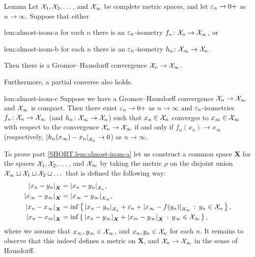 \begin{thm}{Lemma}\label{lem:almost-isom}
Let $\mathcal{X}_1,\mathcal{X}_2,\dots$, and $\mathcal{X}_\infty$ be complete metric spaces,
and let $\varepsilon_n\to0+$ as $n\to\infty$.
Suppose that either 
\begin{subthm}{lem:almost-isom-a}
for each $n$ there is an $\varepsilon_n$-isometry $f_n\colon\mathcal{X}_n\to\mathcal{X}_\infty$, or
\end{subthm}
\begin{subthm}{lem:almost-isom-b}
for each $n$ there is an $\varepsilon_n$-isometry $h_n\colon\mathcal{X}_\infty\to\mathcal{X}_n$.
\end{subthm}
Then there is a Gromov--Hausdorff convergence $\mathcal{X}_n\to \mathcal{X}_\infty$.

Furthermore, a partial converse also holds.

\begin{subthm}{lem:almost-isom-c}
Suppose we have a Gromov--Hausdorff convergence $\mathcal{X}_n\to \mathcal{X}_\infty$ and $\mathcal{X}_\infty$ is compact.
Then there exist $\varepsilon_n\to0+$ as $n\to\infty$ and $\varepsilon_n$-isometries $f_n\colon\mathcal{X}_n\to\mathcal{X}_\infty$ (and $h_n\colon\mathcal{X}_\infty\to\mathcal{X}_n$)
such that $x_n\in \mathcal{X}_n$ converges to $x_\infty \in  \mathcal{X}_\infty$ with respect to the  convergence $\mathcal{X}_n\to \mathcal{X}_\infty$ if and only if $f_n(x_n)\to x_\infty$ (respectively, $|{h_n(x_\infty) }-{x_n}|_{\mathcal{X}_n}^{{}}\to 0$) as $n\to\infty$.
\end{subthm}
\end{thm}


To prove part \ref{SHORT.lem:almost-isom-a} let us construct a common space $\bm{X}$ for the spaces $\mathcal{X}_1,\mathcal{X}_2,\dots$, and $\mathcal{X}_\infty$
by taking the metric $\rho$ on the disjoint union $\mathcal{X}_\infty\sqcup\mathcal{X}_1\sqcup\mathcal{X}_2\sqcup\dots$ that is defined the following way:
\begin{align*}
|{x_n}-{y_n}|_{\bm{X}}^{{}}&=|{x_n}-{y_n}|_{\mathcal{X}_n}^{{}},
\\
|{x_\infty}-{y_\infty}|_{\bm{X}}^{{}}&=|{x_\infty}-{y_\infty}|_{\mathcal{X}_\infty}^{{}},
\\
|{x_n}-{x_\infty}|_{\bm{X}}^{{}}&=\inf\left\{\,{|{x_n}-{y_n}|_{\mathcal{X}_n}^{{}}+\varepsilon_n+|{x_\infty}-{f(y_n)}|_{\mathcal{X}_\infty}^{{}}}\,:\,{{y_n}\in \mathcal{X}_n}\,\right\},
\\
|{x_n}-{x_m}|_{\bm{X}}^{{}}&=\inf\left\{\,{|{x_n}-{y_\infty}|_{\bm{X}}^{{}}+|{x_m}-{y_\infty}|_{\bm{X}}^{{}}}\,:\,{y_\infty\in\mathcal{X}_\infty}\,\right\},
\end{align*}
where we assume that $x_\infty,y_\infty\in \mathcal{X}_\infty$, and $x_n,y_n\in \mathcal{X}_n$ for each $n$. 
It remains to observe that this indeed defines a metric on $\bm{X}$, and $\mathcal{X}_n\to \mathcal{X}_\infty$ in the sense of Hausdorff.

